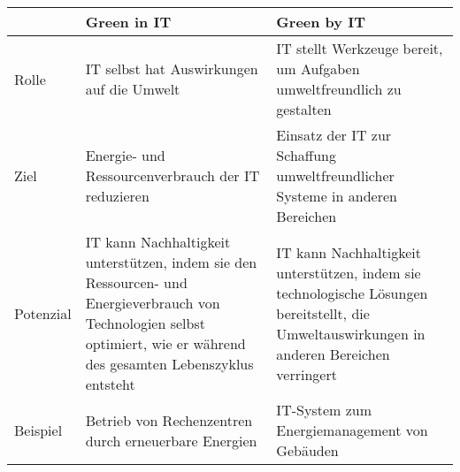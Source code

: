 \begin{tabular}{|p{2cm}|p{6cm}|p{6cm}|}
    \hline
     & Green in \ac{IT} & Green by \ac{IT} \\
    \hline
    \hline
    Rolle & \ac{IT} selbst hat Auswirkungen auf die Umwelt & \ac{IT} stellt Werkzeuge bereit, um Aufgaben umweltfreundlich zu gestalten \\
    \hline
    Ziel & Energie- und Ressourcenverbrauch der \ac{IT} reduzieren & Einsatz der \ac{IT} zur Schaffung umweltfreundlicher Systeme in anderen Bereichen \\
    \hline
    Potenzial & \ac{IT} kann Nachhaltigkeit unterstützen, indem sie den Ressourcen- und Energieverbrauch von Technologien selbst optimiert, wie er während des gesamten Lebenszyklus entsteht & \ac{IT} kann Nachhaltigkeit unterstützen, indem sie technologische Lösungen bereitstellt, die Umweltauswirkungen in anderen Bereichen verringert \\
    \hline
    Beispiel & Betrieb von Rechenzentren durch erneuerbare Energien & \ac{IT}-System zum Energiemanagement von Gebäuden \\
    \hline
\end{tabular}
